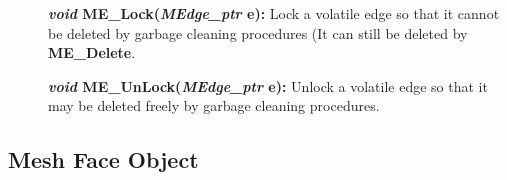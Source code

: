 \documentclass[12pt]{article}
\begin{document}
\begin{description}
\item[]

\item[]{\bf {\em void} ME\_Lock({\em MEdge\_ptr} e):} Lock a volatile
  edge so that it cannot be deleted by garbage cleaning procedures (It
  can still be deleted by {\bf ME\_Delete}.

\item[]{\bf {\em void} ME\_UnLock({\em MEdge\_ptr} e):} Unlock a volatile
  edge so that it may be deleted freely by garbage cleaning procedures.

\end{description}



\newpage
\subsection{Mesh Face Object}
\end{document}
